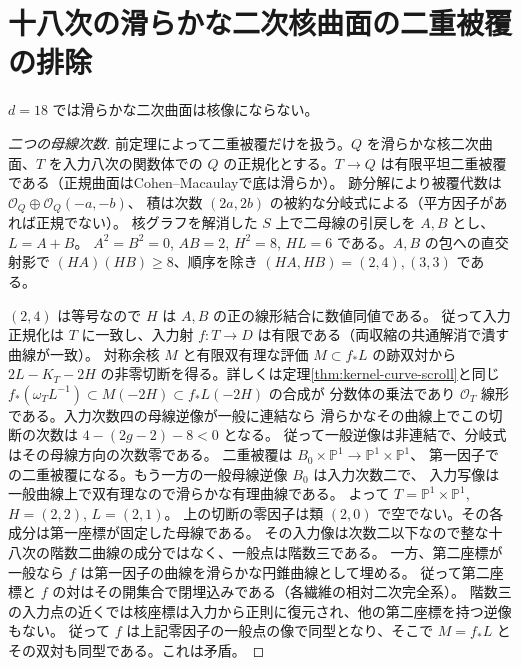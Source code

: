 \section{十八次の滑らかな二次核曲面の二重被覆の排除}
\label{sec:cofactor-eighteen-double-quadric}
\begin{theorem}\label{thm:cofactor-eighteen-no-smooth-quadric}
$d=18$ では滑らかな二次曲面は核像にならない。
\end{theorem}
\begin{proof}[二つの母線次数]
前定理によって二重被覆だけを扱う。$Q$ を滑らかな核二次曲面、$T$ を入力八次の関数体での
$Q$ の正規化とする。$T\to Q$ は有限平坦二重被覆である（正規曲面はCohen--Macaulayで底は滑らか）。
跡分解により被覆代数は $\mathcal O_Q\oplus\mathcal O_Q(-a,-b)$、
積は次数 $(2a,2b)$ の被約な分岐式による（平方因子があれば正規でない）。
核グラフを解消した $S$ 上で二母線の引戻しを $A,B$ とし、$L=A+B$。
$A^2=B^2=0$, $AB=2$, $H^2=8$, $HL=6$ である。$A,B$ の包への直交射影で
$(HA)(HB)\ge8$、順序を除き $(HA,HB)=(2,4),(3,3)$ である。

$(2,4)$ は等号なので $H$ は $A,B$ の正の線形結合に数値同値である。
従って入力正規化は $T$ に一致し、入力射 $f:T\to D$ は有限である（両収縮の共通解消で潰す曲線が一致）。
対称余核 $M$ と有限双有理な評価 $M\subset f_*L$ の跡双対から
$2L-K_T-2H$ の非零切断を得る。詳しくは定理\ref{thm:kernel-curve-scroll}と同じ
$f_*(\omega_T L^{-1})\subset M(-2H)\subset f_*L(-2H)$ の合成が
分数体の乗法であり $\mathcal O_T$ 線形である。入力次数四の母線逆像が一般に連結なら
滑らかなその曲線上でこの切断の次数は $4-(2g-2)-8<0$ となる。
従って一般逆像は非連結で、分岐式はその母線方向の次数零である。
二重被覆は $B_0\times\mathbb P^1\to\mathbb P^1\times\mathbb P^1$、
第一因子での二重被覆になる。もう一方の一般母線逆像 $B_0$ は入力次数二で、
入力写像は一般曲線上で双有理なので滑らかな有理曲線である。
よって $T=\mathbb P^1\times\mathbb P^1$, $H=(2,2)$, $L=(2,1)$。
上の切断の零因子は類 $(2,0)$ で空でない。その各成分は第一座標が固定した母線である。
その入力像は次数二以下なので整な十八次の階数二曲線の成分ではなく、一般点は階数三である。
一方、第二座標が一般なら $f$ は第一因子の曲線を滑らかな円錐曲線として埋める。
従って第二座標と $f$ の対はその開集合で閉埋込みである（各繊維の相対二次完全系）。
階数三の入力点の近くでは核座標は入力から正則に復元され、他の第二座標を持つ逆像もない。
従って $f$ は上記零因子の一般点の像で同型となり、そこで $M=f_*L$ とその双対も同型である。これは矛盾。
\end{proof}

